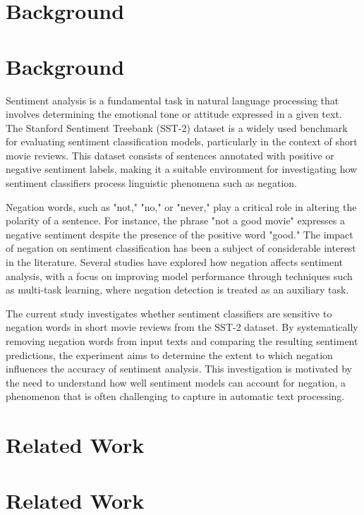 \documentclass{article}
\begin{document}
\section{Background}
\section*{Background}

Sentiment analysis is a fundamental task in natural language processing that involves determining the emotional tone or attitude expressed in a given text. The Stanford Sentiment Treebank (SST-2) dataset is a widely used benchmark for evaluating sentiment classification models, particularly in the context of short movie reviews. This dataset consists of sentences annotated with positive or negative sentiment labels, making it a suitable environment for investigating how sentiment classifiers process linguistic phenomena such as negation.

Negation words, such as "not," "no," or "never," play a critical role in altering the polarity of a sentence. For instance, the phrase "not a good movie" expresses a negative sentiment despite the presence of the positive word "good." The impact of negation on sentiment classification has been a subject of considerable interest in the literature. Several studies have explored how negation affects sentiment analysis, with a focus on improving model performance through techniques such as multi-task learning, where negation detection is treated as an auxiliary task.

The current study investigates whether sentiment classifiers are sensitive to negation words in short movie reviews from the SST-2 dataset. By systematically removing negation words from input texts and comparing the resulting sentiment predictions, the experiment aims to determine the extent to which negation influences the accuracy of sentiment analysis. This investigation is motivated by the need to understand how well sentiment models can account for negation, a phenomenon that is often challenging to capture in automatic text processing.
\section{Related Work}
\section{Related Work}
\end{document}
